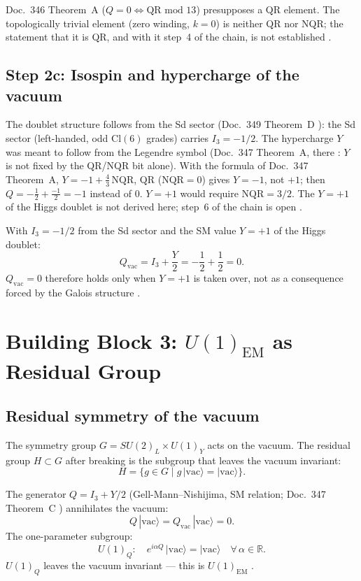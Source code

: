 Doc.~346 Theorem~A ($Q=0 \iff \text{QR mod~13}$) presupposes a QR element.
The topologically trivial element (zero winding, $k=0$) is neither QR nor NQR;
the statement that it is QR, and with it step~4 of the chain, is not
established \SM.

\subsection*{Step 2c: Isospin and hypercharge of the vacuum}

The doublet structure follows from the Sd sector (Doc.~349 Theorem~D \BM):
the Sd sector (left-handed, odd Cl$(6)$ grades) carries $I_3=-1/2$.
The hypercharge $Y$ was meant to follow from the Legendre symbol (Doc.~347 Theorem~A, there \SM: $Y$ is not fixed by the QR/NQR bit alone).
With the formula of Doc.~347 Theorem~A, $Y = -1 + \tfrac43\,\text{NQR}$, QR
($\text{NQR} = 0$) gives $Y = -1$, not $+1$; then $Q = -\tfrac12 + \tfrac{-1}{2} = -1$
instead of $0$. $Y = +1$ would require $\text{NQR} = 3/2$. The $Y = +1$ of the
Higgs doublet is not derived here; step~6 of the chain is open \SM.

With $I_3=-1/2$ from the Sd sector and the SM value $Y=+1$ of the Higgs doublet:
\begin{equation}
  Q_\text{vac} = I_3 + \frac{Y}{2} = -\frac{1}{2} + \frac{1}{2} = 0.
  \label{eq:qvac}
\end{equation}
$Q_\text{vac}=0$ therefore holds only when $Y=+1$ is taken over, not as a
consequence forced by the Galois structure \SM.

\section{Building Block 3: $U(1)_\text{EM}$ as Residual Group}

\subsection*{Residual symmetry of the vacuum}

The symmetry group $G = SU(2)_L\times U(1)_Y$ acts on the vacuum.
The residual group $H\subset G$ after breaking is the subgroup that
leaves the vacuum invariant:
\begin{equation}
  H = \{g\in G \mid g\,|\text{vac}\rangle = |\text{vac}\rangle\}.
\end{equation}

The generator $Q = I_3 + Y/2$ (Gell-Mann--Nishijima, SM relation; Doc.~347 Theorem~C \SM)
annihilates the vacuum:
\begin{equation}
  Q\,|\text{vac}\rangle = Q_\text{vac}\,|\text{vac}\rangle = 0.
\end{equation}
The one-parameter subgroup:
\begin{equation}
  U(1)_Q : \quad e^{i\alpha Q}\,|\text{vac}\rangle = |\text{vac}\rangle
  \quad\forall\,\alpha\in\mathbb{R}.
\end{equation}
$U(1)_Q$ leaves the vacuum invariant --- this is $U(1)_\text{EM}$ \BM.

